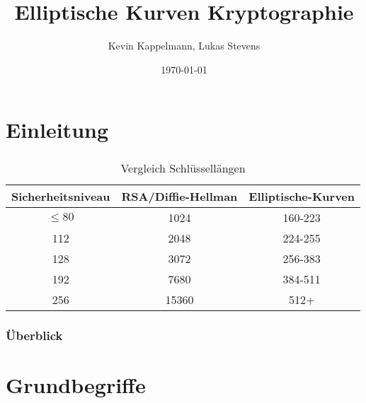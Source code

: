 \documentclass{beamer}
\title[Elliptische-Kurven-Kryptographie]{Elliptische Kurven Kryptographie} %
\author{Kevin Kappelmann, Lukas Stevens} %
\institute[TUM] %
{Technische Universität München \\ %
}
\date{\today} %
\theoremstyle{plain}
\theoremstyle{definition}
\theoremstyle{rem}
\begin{document}
\begin{frame}
\titlepage %
\end{frame}


\section{Einleitung}

\begin{frame}
\frametitle{\insertsection}
\begin{table}[h]
\centering
	\begin{tabular}{| c | c | c |}
	\hline
	\rowcolor{lightblue}
	Sicherheitsniveau & RSA/Diffie-Hellman & Elliptische-Kurven\\ \hline
	\rowcolor{lightred}
	$\le80$ 	& 1024 & 160-223 \\ \hline
	\rowcolor{lightgreen}
	112 	& 2048 & 224-255 \\ \hline
	\rowcolor{lightgreen}
	128 	& 3072 & 256-383 \\ \hline
	\rowcolor{lightgreen}
	192 	& 7680 & 384-511 \\ \hline
	\rowcolor{lightgreen}
	256 	& 15360 & 512+ \\ \hline
	\end{tabular}
\caption{Vergleich Schlüssellängen}
\end{table}
\end{frame}


\begin{frame}
	\frametitle{Überblick} %
\begin{multicols}{2}
\tableofcontents
\end{multicols}
\end{frame}


\section{Grundbegriffe}
\end{document}
